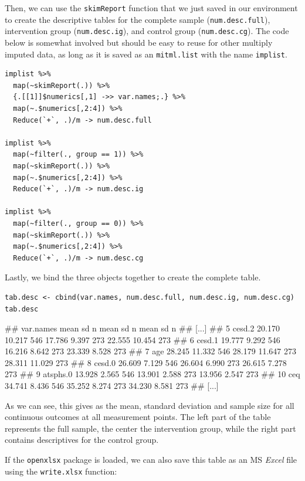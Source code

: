 Then, we can use the \texttt{skimReport} function that we just saved in our environment to create the descriptive tables for the complete sample (\texttt{num.desc.full}), intervention group (\texttt{num.desc.ig}), and control group (\texttt{num.desc.cg}). The code below is somewhat involved but should be easy to reuse for other multiply imputed data, as long as it is saved as an \texttt{mitml.list} with the name \texttt{implist}.

\begin{lstlisting}
implist %>%
  map(~skimReport(.)) %>% 
  {.[[1]]$numerics[,1] ->> var.names;.} %>% 
  map(~.$numerics[,2:4]) %>% 
  Reduce(`+`, .)/m -> num.desc.full

implist %>%
  map(~filter(., group == 1)) %>%
  map(~skimReport(.)) %>% 
  map(~.$numerics[,2:4]) %>% 
  Reduce(`+`, .)/m -> num.desc.ig

implist %>%
  map(~filter(., group == 0)) %>%
  map(~skimReport(.)) %>% 
  map(~.$numerics[,2:4]) %>% 
  Reduce(`+`, .)/m -> num.desc.cg
\end{lstlisting}

Lastly, we bind the three objects together to create the complete table.

\begin{lstlisting}
tab.desc <- cbind(var.names, num.desc.full, num.desc.ig, num.desc.cg)
tab.desc
\end{lstlisting}

\begin{example}
##    var.names   mean     sd   n   mean     sd   n   mean     sd   n
## [...]
## 5     cesd.2 20.170 10.217 546 17.786  9.397 273 22.555 10.454 273
## 6     cesd.1 19.777  9.292 546 16.216  8.642 273 23.339  8.528 273
## 7        age 28.245 11.332 546 28.179 11.647 273 28.311 11.029 273
## 8     cesd.0 26.609  7.129 546 26.604  6.990 273 26.615  7.278 273
## 9   atsphs.0 13.928  2.565 546 13.901  2.588 273 13.956  2.547 273
## 10       ceq 34.741  8.436 546 35.252  8.274 273 34.230  8.581 273
## [...]
\end{example}


As we can see, this gives as the mean, standard deviation and sample size for all continuous outcomes at all measurement points. The left part of the table represents the full sample, the center the intervention group, while the right part contains descriptives for the control group.

If the \texttt{openxlsx} package is loaded, we can also save this table as an MS \emph{Excel} file using the \texttt{write.xlsx} function:

